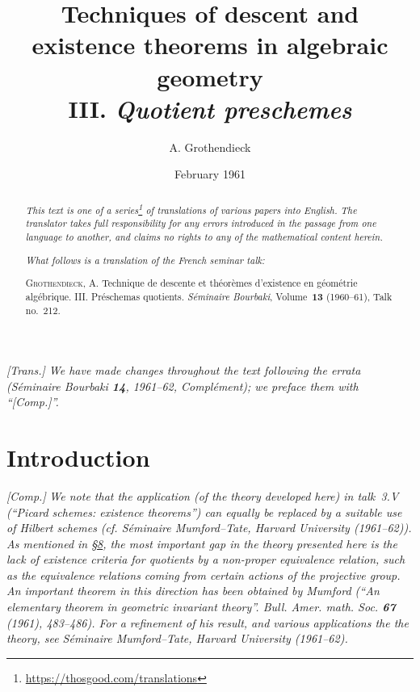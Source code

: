 \documentclass{article}
\title{Techniques of descent and existence theorems in algebraic geometry\\III. \emph{Quotient preschemes}}
\author{A. Grothendieck}
\date{February 1961}
\newcommand{\doctype}{French seminar talk}
\newcommand{\origcit}{%
  \textsc{Grothendieck, A.}
  Technique de descente et th\'{e}or\`{e}mes d'existence en g\'{e}om\'{e}trie alg\'{e}brique. III. Pr\'{e}schemas quotients.
  \emph{S\'{e}minaire Bourbaki}, Volume~\textbf{13} (1960--61), Talk no.~212.%
}
\newcommand{\oldpage}[1]{\marginpar{\footnotesize$\Big\vert$ \textit{p.~#1}}}
\begin{document}
\maketitle
\thispagestyle{fancy}

\renewcommand{\abstractname}{Translator's note.}

\begin{abstract}
  \renewcommand*{\thefootnote}{\fnsymbol{footnote}}
  \emph{This text is one of a series\footnote{\url{https://thosgood.com/translations}} of translations of various papers into English.}
  \emph{The translator takes full responsibility for any errors introduced in the passage from one language to another, and claims no rights to any of the mathematical content herein.}

  \medskip
  
  \emph{What follows is a translation of the \doctype:}

  \medskip\noindent
  \origcit
\end{abstract}

\setcounter{footnote}{0}

\setcounter{tocdepth}{1}
\tableofcontents



\subsubsection*{}

\emph{[Trans.] We have made changes throughout the text following the errata (\emph{S\'{e}minaire Bourbaki} \textbf{14}, 1961--62, Compl\'{e}ment); we preface them with ``[Comp.]''.}
\medskip


\section*{Introduction}
\oldpage{212-01}

\emph{[Comp.]}
\emph{We note that the application (of the theory developed here) in talk~3.V (``Picard schemes: existence theorems'') can equally be replaced by a suitable use of Hilbert schemes (cf. {\normalfont S\'{e}minaire Mumford--Tate, Harvard University (1961--62)}). As mentioned in \hyperref[8]{\S8}, the most important gap in the theory presented here is the lack of existence criteria for quotients by a non-proper equivalence relation, such as the equivalence relations coming from certain actions of the projective group. An important theorem in this direction has been obtained by Mumford ({\normalfont ``An elementary theorem in geometric invariant theory''. \emph{Bull. Amer. math. Soc.} \textbf{67} (1961), 483--486}). For a refinement of his result, and various applications the the theory, see {\normalfont S\'{e}minaire Mumford--Tate, Harvard University (1961--62)}.}
\medskip
\end{document}
